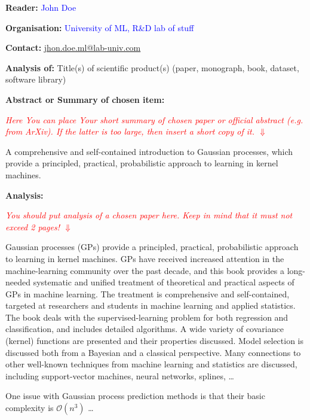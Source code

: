 \documentclass{article}
\begin{document}
\fontsize{10}{12}\rm

\large \textbf{Reader:}             \textcolor{blue}{John Doe}

\large \textbf{Organisation:}       \textcolor{blue}{University of ML, R\&D lab of stuff} 

\large \textbf{Contact:}
    \href{
        mailto:
        jhon.doe.ml@lab-univ.com
    }{
        jhon.doe.ml@lab-univ.com
        }

\large \textbf{Analysis of:} Title(s) of scientific product(s) (paper, monograph, book, dataset, software library)

\large \textbf{Abstract or Summary of chosen item:}

\textcolor{red}{\textit{Here You can place Your short summary of chosen paper or official abstract (e.g. from ArXiv). If the latter is too large, then insert a short copy of it.  \(\Downarrow\)}}

A comprehensive and self-contained introduction to Gaussian processes, which provide a principled, practical, probabilistic approach to learning in kernel machines.

\large \textbf{Analysis:}

\textcolor{red}{\textit{You should put analysis of a chosen paper here. Keep in mind that it must not exceed 2 pages! \(\Downarrow\)}}

Gaussian processes (GPs) provide a principled, practical, probabilistic approach to learning in kernel machines. GPs have received increased attention in the machine-learning community over the past decade, and this book provides a long-needed systematic and unified treatment of theoretical and practical aspects of GPs in machine learning. The treatment is comprehensive and self-contained, targeted at researchers and students in machine learning and applied statistics. The book deals with the supervised-learning problem for both regression and classification, and includes detailed algorithms. A wide variety of covariance (kernel) functions are presented and their properties discussed. Model selection is discussed both from a Bayesian and a classical perspective. Many connections to other well-known techniques from machine learning and statistics are discussed, including support-vector machines, neural networks, splines, \cite{rasmussenGaussianProcessesMachine2006} \dots

One issue with Gaussian process prediction methods is that their basic complexity is \(\mathcal{O}\left(n^{3}\right) \) \dots
\end{document}
